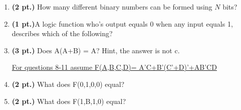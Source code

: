 \documentclass{article}
\begin{document}
\begin{enumerate}
\item {\bf (2 pt.)} How many different binary numbers can be formed
using $N$ bits?

\item {\bf (1 pt.)}A logic function who's output equals 0 when any
input equals 1, describes which of the following?

\item {\bf (3 pt.)} Does A(A+B) = A?
Hint, the answer is not c.
\pagebreak
\underline{For questions 8-11 assume F(A,B,C,D)= A'C+B'(C'+D)'+AB'CD}

\item {\bf (2 pt.)} What does F(0,1,0,0) equal?

\item {\bf (2 pt.)} What does F(1,B,1,0) equal?


\end{enumerate}
\end{document}
